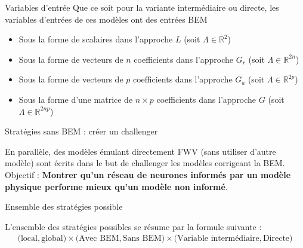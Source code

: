\documentclass[
11pt,notheorems,hyperref={pdfauthor=whatever}
]{beamer}
\begin{document}
\begin{frame}{Variables d'entrée}
    Que ce soit pour la variante intermédiaire ou directe, les variables d'entrées de ces modèles ont des entrées BEM 
    \begin{itemize}
        \item Sous la forme de scalaires dans l'approche $L$ (soit $ \Lambda \in \mathbb{R}^2$)
        \item Sous la forme de vecteurs de $n$ coefficients dans l'approche $G_r$ (soit $ \Lambda \in \mathbb{R}^{2n}$)
        \item Sous la forme de vecteurs de $p$ coefficients dans l'approche $G_a$ (soit $ \Lambda \in \mathbb{R}^{2p}$)
        \item Sous la forme d'une matrice de $n \times p$ coefficients dans l'approche $G$ (soit $ \Lambda \in \mathbb{R}^{2np}$)
    \end{itemize}
\end{frame}

\begin{frame}{Stratégies sans BEM : créer un challenger}
    \begin{center}
    En parallèle, des modèles émulant directement FWV (sans utiliser d'autre modèle) sont écrits dans le but de challenger les modèles corrigeant la BEM.\\ 
    Objectif : \textbf{Montrer qu'un réseau de neurones informés par un modèle physique performe mieux qu'un modèle non informé}.
    \end{center}
\end{frame}

\begin{frame}{Ensemble des stratégies possible}
    \begin{center}
        L'ensemble des stratégies possibles se résume par la formule suivante : 
        \begin{align*}
            \bigl(\text{local}, \text{global}\bigr) \times \bigl(\text{Avec BEM}, \text{Sans BEM}\bigr) \times \bigl(\text{Variable intermédiaire}, \text{Directe}\bigr)
        \end{align*}
    \end{center}
\end{frame}



\end{document}
